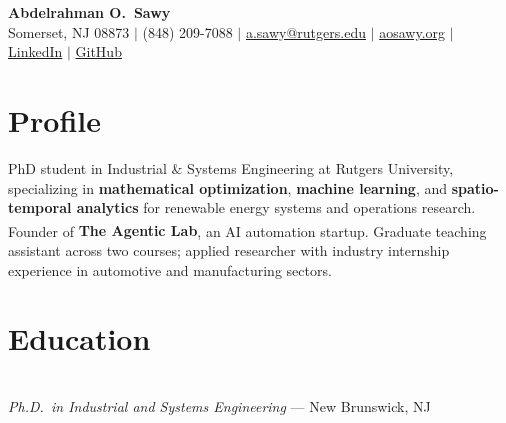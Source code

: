 \documentclass[10pt, letterpaper]{article}
\begin{document}
\begin{center}
  {\color{navyblue}\LARGE\bfseries Abdelrahman O.\ Sawy}\\[4pt]
  {\small
    Somerset, NJ 08873
    \enspace\textcolor{subtlegray}{$|$}\enspace
    (848) 209-7088
    \enspace\textcolor{subtlegray}{$|$}\enspace
    \href{mailto:a.sawy@rutgers.edu}{a.sawy@rutgers.edu}
    \enspace\textcolor{subtlegray}{$|$}\enspace
    \href{https://aosawy.org}{aosawy.org}
    \enspace\textcolor{subtlegray}{$|$}\enspace
    \href{https://www.linkedin.com/in/abdelrahman-sawy-542740295/}{LinkedIn}
    \enspace\textcolor{subtlegray}{$|$}\enspace
    \href{https://github.com/AOSawy}{GitHub}
  }
\end{center}

\vspace{1pt}

\section{Profile}

PhD student in Industrial \& Systems Engineering at Rutgers University, specializing in
\textbf{mathematical optimization}, \textbf{machine learning}, and \textbf{spatio-temporal analytics}
for renewable energy systems and operations research.
Founder of \textbf{The Agentic Lab\textsuperscript{\textregistered}}, an AI automation startup.
Graduate teaching assistant across two courses; applied researcher with industry internship experience in automotive and manufacturing sectors.

\vspace{1pt}

\section{Education}

\\
\textit{Ph.D.\ in Industrial and Systems Engineering} --- New Brunswick, NJ

\entrysep
\end{document}
